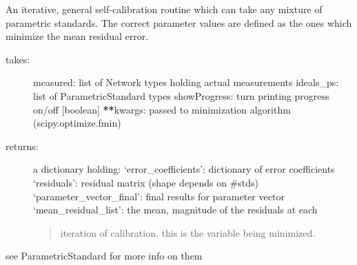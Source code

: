 \documentclass[letterpaper,10pt,english]{sphinxmanual}
\begin{document}
\begin{fulllineitems}
\label{api/mwavepy.calibration:mwavepy.calibration.calibrationAlgorithms.parameterized_self_calibration_nls}
An iterative, general self-calibration routine which can take any
mixture of parametric standards. The correct parameter values
are defined as the ones which minimize the mean residual error.
\begin{description}
\item[{takes:}] \leavevmode
measured: list of Network types holding actual measurements
ideals\_ps: list of ParametricStandard types
showProgress: turn printing progress on/off {[}boolean{]}
{\color{red}\bfseries{}**}kwargs: passed to minimization algorithm (scipy.optimize.fmin)

\item[{returns:}] \leavevmode
a dictionary holding:
`error\_coefficients': dictionary of error coefficients
`residuals': residual matrix (shape depends on \#stds)
`parameter\_vector\_final': final results for parameter vector
`mean\_residual\_list': the mean, magnitude of the residuals at each
\begin{quote}

iteration of calibration. this is the variable being minimized.
\end{quote}

\end{description}

see  ParametricStandard for more info on them

\end{fulllineitems}

\end{document}
